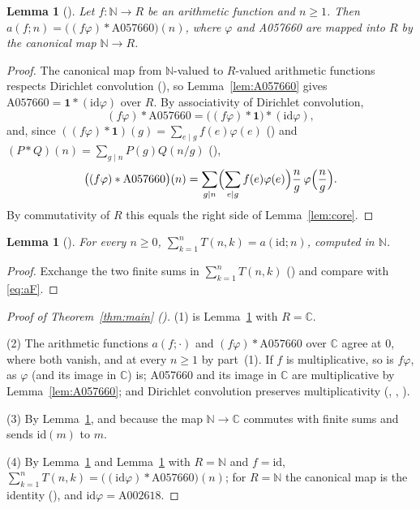 \documentclass[11pt]{amsart}
\theoremstyle{plain}
\newtheorem{lemma}[theorem]{Lemma}
\theoremstyle{definition}
\newcommand{\N}{\mathbb{N}}
\newcommand{\C}{\mathbb{C}}
\newcommand{\idf}{\mathrm{id}}
\newcommand{\A}[1]{\mathrm{A#1}}
\begin{document}
\begin{lemma}[]\label{lem:main}
Let $f\colon\N\to R$ be an arithmetic function and $n\ge1$. Then $a(f;n)=\bigl((f\varphi)*\A{057660}\bigr)(n)$, where $\varphi$ and A057660 are mapped into $R$ by the canonical map $\N\to R$.
\end{lemma}

\begin{proof}
The canonical map from $\N$-valued to $R$-valued arithmetic functions respects Dirichlet convolution (), so Lemma~\ref{lem:A057660} gives $\A{057660}=\mathbf 1*(\idf\varphi)$ over $R$. By associativity of Dirichlet convolution,
\[ (f\varphi)*\A{057660}=\bigl((f\varphi)*\mathbf 1\bigr)*(\idf\varphi), \]
and, since $((f\varphi)*\mathbf 1)(g)=\sum_{e\mid g}f(e)\varphi(e)$ () and $(P*Q)(n)=\sum_{g\mid n}P(g)Q(n/g)$ (),
\[ \bigl((f\varphi)*\A{057660}\bigr)(n)=\sum_{g\mid n}\Bigl(\sum_{e\mid g}f(e)\varphi(e)\Bigr)\frac ng\,\varphi\Bigl(\frac ng\Bigr). \]
By commutativity of $R$ this equals the right side of Lemma~\ref{lem:core}.
\end{proof}

\begin{lemma}[]\label{lem:rowsum}
For every $n\ge0$, $\sum_{k=1}^{n}T(n,k)=a(\idf;n)$, computed in $\N$.
\end{lemma}

\begin{proof}
Exchange the two finite sums in $\sum_{k=1}^{n}T(n,k)$ () and compare with \eqref{eq:aF}.
\end{proof}

\begin{proof}[Proof of Theorem~\ref{thm:main} ()]
(1) is Lemma~\ref{lem:main} with $R=\C$.

(2) The arithmetic functions $a(f;\cdot)$ and $(f\varphi)*\A{057660}$ over $\C$ agree at $0$, where both vanish, and at every $n\ge1$ by part~(1). If $f$ is multiplicative, so is $f\varphi$, as $\varphi$ (and its image in $\C$) is; A057660 and its image in $\C$ are multiplicative by Lemma~\ref{lem:A057660}; and Dirichlet convolution preserves multiplicativity (, , ).

(3) By Lemma~\ref{lem:rowsum}, and because the map $\N\to\C$ commutes with finite sums and sends $\idf(m)$ to $m$.

(4) By Lemma~\ref{lem:rowsum} and Lemma~\ref{lem:main} with $R=\N$ and $f=\idf$, $\sum_{k=1}^{n}T(n,k)=\bigl((\idf\varphi)*\A{057660}\bigr)(n)$; for $R=\N$ the canonical map is the identity (), and $\idf\varphi=\A{002618}$.
\end{proof}
\end{document}
